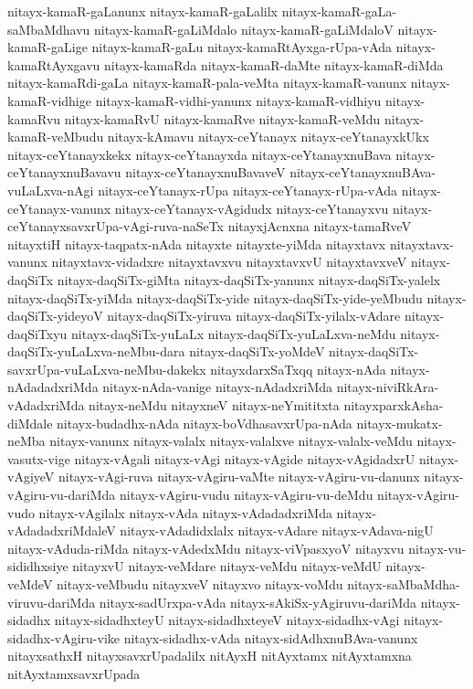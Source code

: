 {nitayx-kamaR-gaLanunx
nitayx-kamaR-gaLalilx
nitayx-kamaR-gaLa-saMbaMdhavu
nitayx-kamaR-gaLiMdalo
nitayx-kamaR-gaLiMdaloV
nitayx-kamaR-gaLige
nitayx-kamaR-gaLu
nitayx-kamaRtAyxga-rUpa-vAda
nitayx-kamaRtAyxgavu
nitayx-kamaRda
nitayx-kamaR-daMte
nitayx-kamaR-diMda
nitayx-kamaRdi-gaLa
nitayx-kamaR-pala-veMta
nitayx-kamaR-vanunx
nitayx-kamaR-vidhige
nitayx-kamaR-vidhi-yanunx
nitayx-kamaR-vidhiyu
nitayx-kamaRvu
nitayx-kamaRvU
nitayx-kamaRve
nitayx-kamaR-veMdu
nitayx-kamaR-veMbudu
nitayx-kAmavu
nitayx-ceYtanayx
nitayx-ceYtanayxkUkx
nitayx-ceYtanayxkekx
nitayx-ceYtanayxda
nitayx-ceYtanayxnuBava
nitayx-ceYtanayxnuBavavu
nitayx-ceYtanayxnuBavaveV
nitayx-ceYtanayxnuBAva-vuLaLxva-nAgi
nitayx-ceYtanayx-rUpa
nitayx-ceYtanayx-rUpa-vAda
nitayx-ceYtanayx-vanunx
nitayx-ceYtanayx-vAgidudx
nitayx-ceYtanayxvu
nitayx-ceYtanayxsavxrUpa-vAgi-ruva-naSeTx
nitayxjAcnxna
nitayx-tamaRveV
nitayxtiH
nitayx-taqpatx-nAda
nitayxte
nitayxte-yiMda
nitayxtavx
nitayxtavx-vanunx
nitayxtavx-vidadxre
nitayxtavxvu
nitayxtavxvU
nitayxtavxveV
nitayx-daqSiTx
nitayx-daqSiTx-giMta
nitayx-daqSiTx-yanunx
nitayx-daqSiTx-yalelx
nitayx-daqSiTx-yiMda
nitayx-daqSiTx-yide
nitayx-daqSiTx-yide-yeMbudu
nitayx-daqSiTx-yideyoV
nitayx-daqSiTx-yiruva
nitayx-daqSiTx-yilalx-vAdare
nitayx-daqSiTxyu
nitayx-daqSiTx-yuLaLx
nitayx-daqSiTx-yuLaLxva-neMdu
nitayx-daqSiTx-yuLaLxva-neMbu-dara
nitayx-daqSiTx-yoMdeV
nitayx-daqSiTx-savxrUpa-vuLaLxva-neMbu-dakekx
nitayxdarxSaTxqq
nitayx-nAda
nitayx-nAdadadxriMda
nitayx-nAda-vanige
nitayx-nAdadxriMda
nitayx-niviRkAra-vAdadxriMda
nitayx-neMdu
nitayxneV
nitayx-neYmititxta
nitayxparxkAsha-diMdale
nitayx-budadhx-nAda
nitayx-boVdhasavxrUpa-nAda
nitayx-mukatx-neMba
nitayx-vanunx
nitayx-valalx
nitayx-valalxve
nitayx-valalx-veMdu
nitayx-vasutx-vige
nitayx-vAgali
nitayx-vAgi
nitayx-vAgide
nitayx-vAgidadxrU
nitayx-vAgiyeV
nitayx-vAgi-ruva
nitayx-vAgiru-vaMte
nitayx-vAgiru-vu-danunx
nitayx-vAgiru-vu-dariMda
nitayx-vAgiru-vudu
nitayx-vAgiru-vu-deMdu
nitayx-vAgiru-vudo
nitayx-vAgilalx
nitayx-vAda
nitayx-vAdadadxriMda
nitayx-vAdadadxriMdaleV
nitayx-vAdadidxlalx
nitayx-vAdare
nitayx-vAdava-nigU
nitayx-vAduda-riMda
nitayx-vAdedxMdu
nitayx-viVpasxyoV
nitayxvu
nitayx-vu-sididhxsiye
nitayxvU
nitayx-veMdare
nitayx-veMdu
nitayx-veMdU
nitayx-veMdeV
nitayx-veMbudu
nitayxveV
nitayxvo
nitayx-voMdu
nitayx-saMbaMdha-viruvu-dariMda
nitayx-sadUrxpa-vAda
nitayx-sAkiSx-yAgiruvu-dariMda
nitayx-sidadhx
nitayx-sidadhxteyU
nitayx-sidadhxteyeV
nitayx-sidadhx-vAgi
nitayx-sidadhx-vAgiru-vike
nitayx-sidadhx-vAda
nitayx-sidAdhxnuBAva-vanunx
nitayxsathxH
nitayxsavxrUpadalilx
nitAyxH
nitAyxtamx
nitAyxtamxna
nitAyxtamxsavxrUpada
}
